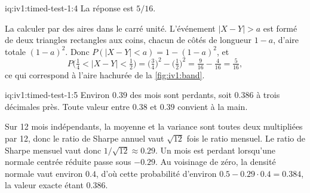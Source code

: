 \begin{solution}{iq:iv1:timed-test-1:4}
La réponse est $5/16$.

La calculer par des aires dans le carré unité. L'événement $|X - Y| > a$ est formé de deux triangles rectangles aux coins, chacun de côtés de longueur $1 - a$, d'aire totale $(1 - a)^2$. Donc $P(|X - Y| < a) = 1 - (1 - a)^2$, et
\[
P\bigl(\tfrac14 < |X - Y| < \tfrac12\bigr) = \bigl(\tfrac34\bigr)^2 - \bigl(\tfrac12\bigr)^2 = \tfrac{9}{16} - \tfrac{4}{16} = \tfrac{5}{16} ,
\]
ce qui correspond à l'aire hachurée de la \cref{fig:iv1:band}.

\begin{omfigure}

\label{fig:iv1:band}
\end{omfigure}
\end{solution}

\begin{solution}{iq:iv1:timed-test-1:5}
Environ $0.39$ des mois sont perdants, soit $0.386$ à trois décimales près. Toute valeur entre $0.38$ et $0.39$ convient à la main.

Sur 12 mois indépendants, la moyenne et la variance sont toutes deux multipliées par 12, donc le ratio de Sharpe annuel vaut $\sqrt{12}$ fois le ratio mensuel. Le ratio de Sharpe mensuel vaut donc $1/\sqrt{12} \approx 0.29$. Un mois est perdant lorsqu'une normale centrée réduite passe sous $-0.29$. Au voisinage de zéro, la densité normale vaut environ $0.4$, d'où cette probabilité d'environ $0.5 - 0.29 \cdot 0.4 = 0.384$, la valeur exacte étant $0.386$.

\end{solution}

